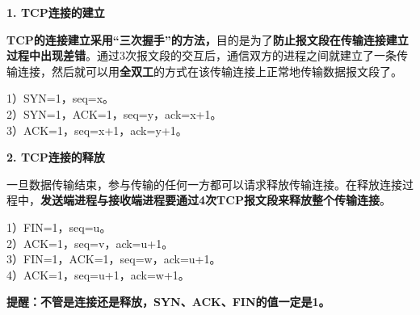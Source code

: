 \textbf{{1. TCP连接的建立}}

\textbf{{TCP的连接建立采用``三次握手''的方法}，}{}目的是为了\textbf{防止报文段在传输连接建立过程中出现差错}。通过3次报文段的交互后，通信双方的进程之间就建立了一条传输连接，然后就可以用{\textbf{全双工}}的方式在该传输连接上正常地传输数据报文段了。

1）SYN=1，seq=x。\\
2）SYN=1，ACK=1，seq=y，ack=x+1。\\
3）ACK=1，seq=x+1，ack=y+1。

\textbf{\textbf{{2. TCP连接的释放}}\\
}

一旦数据传输结束，参与传输的任何一方都可以请求释放传输连接。在释放连接过程中，\textbf{发送端进程与接收端进程要通过4次TCP报文段来释放整个传输连接}。

1）FIN=1，seq=u。\\
2）ACK=1，seq=v，ack=u+1。\\
3）FIN=1，ACK=1，seq=w，ack=u+1。\\
4）ACK=1，seq=u+1，ack=w+1。

{\textbf{提醒：}}{\textbf{不管是连接还是释放，SYN、ACK、FIN的值一定是1。}}
